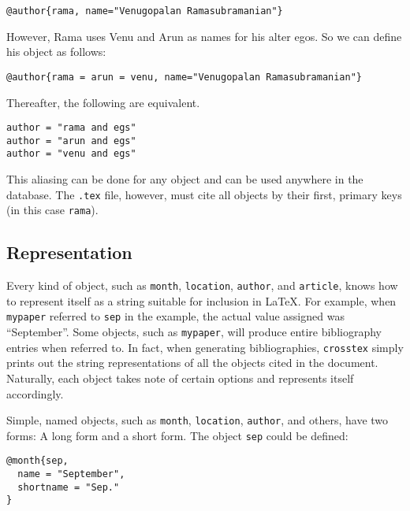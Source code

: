 \documentclass{article}
\begin{document}
\begin{small}\begin{verbatim}
@author{rama, name="Venugopalan Ramasubramanian"}
\end{verbatim}\end{small}

However, Rama uses Venu and Arun as names for his alter egos. So we can define his object as follows:

\begin{small}\begin{verbatim}
@author{rama = arun = venu, name="Venugopalan Ramasubramanian"}
\end{verbatim}\end{small}

Thereafter, the following are equivalent.

\begin{small}\begin{verbatim}
author = "rama and egs"
author = "arun and egs"
author = "venu and egs"
\end{verbatim}\end{small}

This aliasing can be done for any object and can be used anywhere in the database. The \texttt{.tex} file, however, must cite all objects by their first, primary keys (in this case \texttt{rama}).


\subsection{Representation}

Every kind of object, such as \texttt{month}, \texttt{location}, \texttt{author}, and \texttt{article}, knows how to represent itself as a string suitable for inclusion in \LaTeX{}. For example, when \texttt{mypaper} referred to \texttt{sep} in the example, the actual value assigned was ``September''. Some objects, such as \texttt{mypaper}, will produce entire bibliography entries when referred to. In fact, when generating bibliographies, \texttt{crosstex} simply prints out the string representations of all the objects cited in the document. Naturally, each object takes note of certain options and represents itself accordingly.

Simple, named objects, such as \texttt{month}, \texttt{location}, \texttt{author}, and others, have two forms: A long form and a short form. The object \texttt{sep} could be defined:

\begin{small}\begin{verbatim}
@month{sep,
  name = "September",
  shortname = "Sep."
}
\end{verbatim}\end{small}
\end{document}
